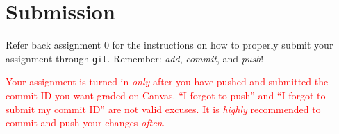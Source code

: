 \section{Submission}

Refer back assignment 0 for the instructions on how to properly submit your
assignment through \texttt{git}. Remember: \emph{add}, \emph{commit}, and
\emph{push}!

\textcolor{red}{Your assignment is turned in \emph{only} after you have pushed
and submitted the commit ID you want graded on Canvas. ``I forgot to push'' and
``I forgot to submit my commit ID'' are not valid excuses. It is \emph{highly}
recommended to commit and push your changes \emph{often}.}

